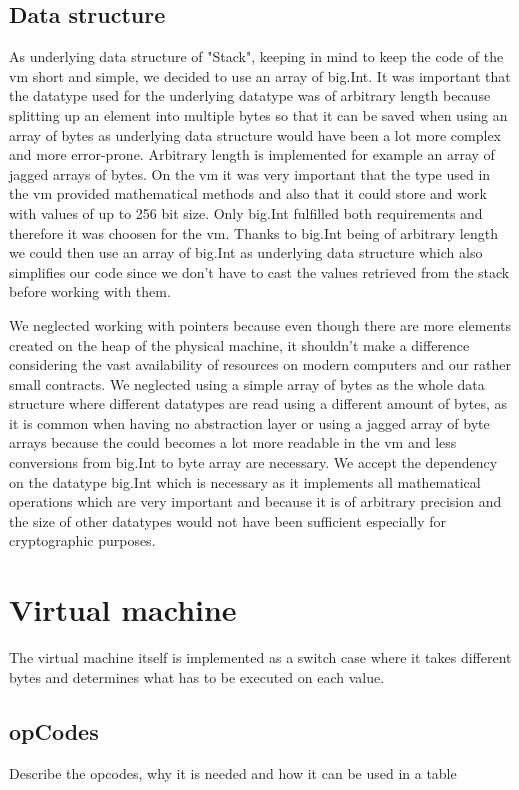 \subsection{Data structure}
As underlying data structure of "Stack", keeping in mind to keep the code of the vm short and simple, we decided to use an array of big.Int. It was important that the datatype used for the underlying datatype was of arbitrary length because splitting up an element into multiple bytes so that it can be saved when using an array of bytes as underlying data structure would have been a lot more complex and more error-prone. Arbitrary length is implemented for example an array of jagged arrays of bytes. On the vm it was very important that the type used in the vm provided mathematical methods and also that it could store and work with values of up to 256 bit size. Only big.Int fulfilled both requirements and therefore it was choosen for the vm. Thanks to big.Int being of arbitrary length we could then use an array of big.Int as underlying data structure which also simplifies our code since we don't have to cast the values retrieved from the stack before working with them.

We neglected working with pointers because even though there are more elements created on the heap of the physical machine, it shouldn't make a difference considering the vast availability of resources on modern computers and our rather small contracts. We neglected using a simple array of bytes as the whole data structure where different datatypes are read using a different amount of bytes, as it is common when having no abstraction layer or using a jagged array of byte arrays because the could becomes a lot more readable in the vm and less conversions from big.Int to byte array are necessary. We accept the dependency on the datatype big.Int which is necessary as it implements all mathematical operations which are very important and because it is of arbitrary precision and the size of other datatypes would not have been sufficient especially for cryptographic purposes.

\section{Virtual machine}
The virtual machine itself is implemented as a switch case where it takes different bytes and determines what has to be executed on each value. 


\subsection{opCodes}
Describe the opcodes, why it is needed and how it can be used in a table

